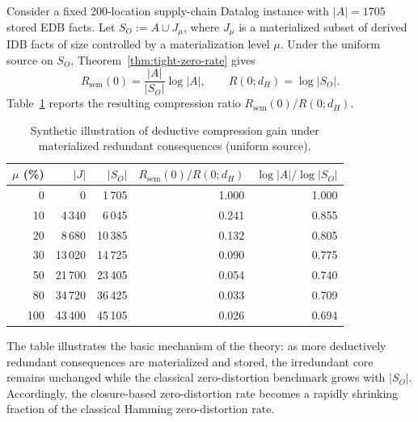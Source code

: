 \documentclass[journal,onecolumn]{IEEEtran}
\numberwithin{equation}{section}
\begin{document}
Consider a fixed 200-location supply-chain Datalog instance with
\(|A|=1705\) stored EDB facts.
Let \(S_O:=A\cup J_\mu\), where \(J_\mu\) is a materialized subset of
derived IDB facts of size controlled by a materialization level
\(\mu\).
Under the uniform source on \(S_O\),
Theorem~\ref{thm:tight-zero-rate} gives
\[
  R_{\mathrm{sem}}(0)
  =
  \frac{|A|}{|S_O|}\log |A|,
  \qquad
  R(0;d_H)=\log |S_O|.
\]
Table~\ref{tab:compression-gain-appendix} reports the resulting
compression ratio
\(R_{\mathrm{sem}}(0)/R(0;d_H)\).

\begin{table}[ht]
\centering
\caption{Synthetic illustration of deductive compression gain under
materialized redundant consequences (uniform source).}
\label{tab:compression-gain-appendix}
\renewcommand{\arraystretch}{1.15}
\setlength{\tabcolsep}{5pt}
\footnotesize
\begin{tabular}{rrrrr}
\toprule
\(\mu\) (\%) & \(|J|\) & \(|S_O|\) &
\(R_{\mathrm{sem}}(0)/R(0;d_H)\) &
\(\log|A|/\log|S_O|\) \\
\midrule
  0   &      0 &  1\,705 & 1.000 & 1.000 \\
 10   &  4\,340 &  6\,045 & 0.241 & 0.855 \\
 20   &  8\,680 & 10\,385 & 0.132 & 0.805 \\
 30   & 13\,020 & 14\,725 & 0.090 & 0.775 \\
 50   & 21\,700 & 23\,405 & 0.054 & 0.740 \\
 80   & 34\,720 & 36\,425 & 0.033 & 0.709 \\
100   & 43\,400 & 45\,105 & 0.026 & 0.694 \\
\bottomrule
\end{tabular}
\end{table}

The table illustrates the basic mechanism of the theory:
as more deductively redundant consequences are materialized and stored,
the irredundant core remains unchanged while the classical
zero-distortion benchmark grows with \(|S_O|\).
Accordingly, the closure-based zero-distortion rate becomes a rapidly
shrinking fraction of the classical Hamming zero-distortion rate.





\vfill
\end{document}
